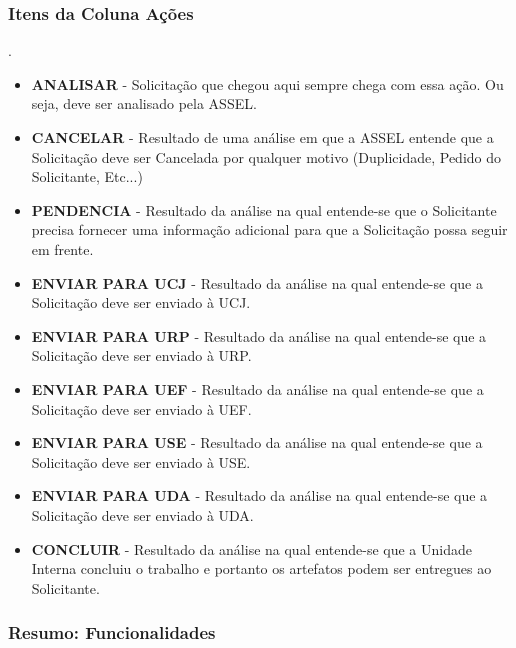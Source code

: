 	\subsubsection{Itens da Coluna Ações}
	
	
	.
	

	
	\begin{itemize}
		\item \textbf{ANALISAR} - Solicitação que chegou aqui sempre chega com essa ação. Ou seja, deve ser analisado pela ASSEL.
		
		\item \textbf{CANCELAR} - Resultado de uma análise em que a ASSEL entende que a Solicitação deve ser Cancelada por qualquer motivo (Duplicidade, Pedido do Solicitante, Etc...)
		
		\item \textbf{PENDENCIA} - Resultado da análise na qual entende-se que o Solicitante precisa fornecer uma informação adicional para que a Solicitação possa seguir em frente.
		
		\item \textbf{ENVIAR PARA UCJ} - Resultado da análise na qual entende-se que a Solicitação deve ser enviado à UCJ.
		
		\item \textbf{ENVIAR PARA URP} - Resultado da análise na qual entende-se que a Solicitação deve ser enviado à URP.
		
		\item \textbf{ENVIAR PARA UEF} - Resultado da análise na qual entende-se que a Solicitação deve ser enviado à UEF.
		
		\item \textbf{ENVIAR PARA USE} - Resultado da análise na qual entende-se que a Solicitação deve ser enviado à USE.
		
		\item \textbf{ENVIAR PARA UDA} - Resultado da análise na qual entende-se que a Solicitação deve ser enviado à UDA.
		
		\item \textbf{CONCLUIR} - Resultado da análise na qual entende-se que a Unidade Interna concluiu o trabalho e portanto os artefatos podem ser entregues ao Solicitante.
	\end{itemize}


	\subsubsection{Resumo: Funcionalidades}
	
